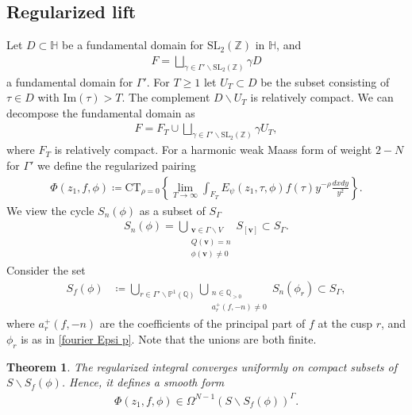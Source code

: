 \documentclass[twoside,a4paper,10pt]{article} %
\newcommand{\dxdy}{\frac{dxdy}{y^2}}
\newcommand{\8}{\infty}
\newcommand{\Z}{\mathbb{Z}}
\newcommand{\vbf}{\mathbf{v}}
\newcommand{\SL}{\mathrm{SL}}
\newcommand{\HH}{\mathbb{H}}
\newcommand{\Q}{\mathbb{Q}}
\newcommand{\PP}{\mathbb{P}}
\newcommand{\CT}{\mathrm{CT}_{\rho=0}}
\newcommand{\im}{\mathrm{Im}}
\theoremstyle{mytheoremstyle}
\newtheorem{thm}{Theorem}[section]
\theoremstyle{remark}
\numberwithin{equation}{section}
\begin{document}
\subsection{Regularized lift} Let $D \subset \HH$ be a fundamental domain for $\SL_2(\Z)$ in $\HH$, and 
\begin{align}
F= \bigsqcup_{\gamma \in \Gamma' \backslash \SL_2(\Z)} \gamma D
\end{align}
a fundamental domain for $\Gamma'$. For $T\geq 1$ let $U_T \subset D$ be the subset  consisting of $\tau \in D$ with $\im(\tau) > T$. The complement $D \smallsetminus U_T$ is relatively compact. We can decompose the fundamental domain as 
\begin{align}
F= F_T \cup  \bigsqcup_{\gamma \in \Gamma' \backslash \SL_2(\Z)} \gamma U_T,
\end{align}
where $F_T$ is relatively compact. For a harmonic weak Maass form of weight $2-N$ for $\Gamma'$ we define the regularized pairing 
\begin{align} \label{definition of regularized lift}
\Phi(z_1,f,\phi) \coloneqq \CT \left \{ \lim_{T\rightarrow \8} \int_{F_T} E_{\psi}(z_1,\tau,\phi)f(\tau) y^{-\rho} \dxdy \right \}.
\end{align}
We view the cycle $S_n(\phi)$ as a subset of $S_\Gamma$
\begin{align}
S_n(\phi)= \bigcup_{\substack{ \vbf \in \Gamma \backslash V \\ Q(\vbf)=n \\ \phi (\vbf) \neq 0}} S_{[\vbf]} \subset S_\Gamma.
\end{align}
Consider the set
\begin{align}\label{singular locus}
S_f(\phi)& \coloneqq \bigcup_{r \in \Gamma' \backslash \PP^1(\Q)} \bigcup_{\substack{ n \in \Q_{>0} \\ a^+_r(f,-n) \neq 0}} S_n(\phi_r) \subset S_\Gamma,
\end{align}
where $a^+_r(f,-n)$ are the coefficients of the principal part of $f$ at the cusp $r$, and $\phi_r$ is as in \eqref{fourier Epsi p}. Note that the unions are both finite.

\begin{thm} \label{maintheorem1}The regularized integral converges uniformly on compact subsets of $S \smallsetminus S_f(\phi)$. Hence, it defines a smooth form 
\begin{align}
\Phi(z_1,f,\phi) \in \Omega^{N-1}(S \smallsetminus S_f(\phi))^\Gamma.
\end{align}
\end{thm}
\end{document}
